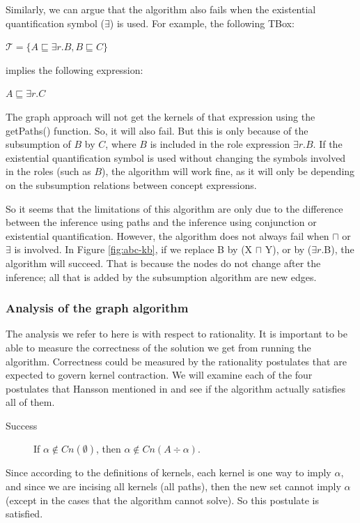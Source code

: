 Similarly, we can argue that the algorithm also fails when the existential quantification symbol ($\exists$) is used. For example, the following TBox:
\begin{center}
$\mathcal{T} = \lbrace A \sqsubseteq \exists r.B, B \sqsubseteq C \rbrace$
\end{center}
implies the following expression:
\begin{center}
$A \sqsubseteq \exists r.C$
\end{center}
The graph approach will not get the kernels of that expression using the getPaths() function. So, it will also fail. But this is only because of the subsumption of $B$ by $C$, where $B$ is included in the role expression $\exists r.B$. If the existential quantification symbol is used without changing the symbols involved in the roles (such as $B$), the algorithm will work fine, as it will only be depending on the subsumption relations between concept expressions.

So it seems that the limitations of this algorithm are only due to the difference between the inference using paths and the inference using conjunction or existential quantification. However, the algorithm does not always fail when $\sqcap$ or $\exists$ is involved. In Figure \ref{fig:abc-kb}, if we replace B by (X $\sqcap$ Y), or by  ($\exists r.$B), the algorithm will succeed. That is because the nodes do not change after the inference; all that is added by the subsumption algorithm are new edges. 


\subsubsection{Analysis of the graph algorithm}
The analysis we refer to here is with respect to rationality. It is important to be able to measure the correctness of the solution we get from running the algorithm. Correctness could be measured by the rationality postulates that are expected to govern kernel contraction. We will examine each of the four postulates that Hansson mentioned in \cite{hansson} and see if the algorithm actually satisfies all of them.

\begin{description}
\item[Success] If $\alpha \notin Cn(\emptyset)$, then $\alpha \notin Cn(A \div \alpha)$.
\end{description}
Since according to the definitions of kernels, each kernel is one way to imply $\alpha$, and since we are incising all kernels (all paths), then the new set cannot imply $\alpha$ (except in the cases that the algorithm cannot solve). So this postulate is satisfied.

